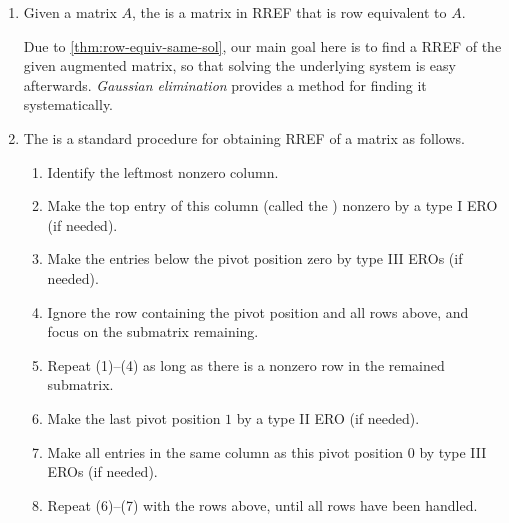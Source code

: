 \begin{enumerate}
\item Given a matrix \(A\), the  is a matrix in RREF that
is row equivalent to \(A\).

Due to \cref{thm:row-equiv-same-sol}, our main goal here is to find a RREF of
the given augmented matrix, so that solving the underlying system is easy
afterwards. \emph{Gaussian elimination} provides a method for finding it
systematically.

\item The  is a standard procedure for obtaining
RREF of a matrix as follows.
\begin{enumerate}[label=(\arabic*)]
\item Identify the leftmost nonzero column.
\item Make the top entry of this column (called the )
nonzero by a type I ERO (if needed).
\item Make the entries below the pivot position zero by type III EROs (if
needed).
\item Ignore the row containing the pivot position and all rows above, and
focus on the submatrix remaining.
\item Repeat (1)--(4) as long as there is a nonzero row in the remained
submatrix.
\item Make the last pivot position \(1\) by a type II ERO (if needed).
\item Make all entries in the same column as this pivot position \(0\) by type
III EROs (if needed).
\item Repeat (6)--(7) with the rows above, until all rows have been handled.
\end{enumerate}


\end{enumerate}
